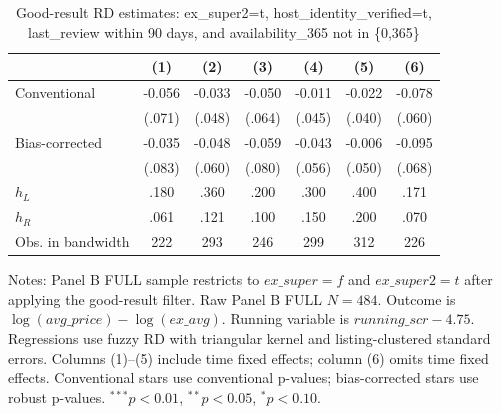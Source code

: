 \begin{table}[!htbp]
\centering
\caption{Good-result RD estimates: ex\_super2=t, host\_identity\_verified=t, last\_review within 90 days, and availability\_365 not in \{0,365\}}
\label{tab:good_result_verified_last_review90_no_av365_extreme_full}
\begin{tabular}{lcccccc}
\hline
 & (1) & (2) & (3) & (4) & (5) & (6) \\
\hline
Conventional & -0.056 & -0.033 & -0.050 & -0.011 & -0.022 & -0.078
\\
 & (.071) & (.048) & (.064) & (.045) & (.040) & (.060)
\\
Bias-corrected & -0.035 & -0.048 & -0.059 & -0.043 & -0.006 & -0.095
\\
 & (.083) & (.060) & (.080) & (.056) & (.050) & (.068)
\\
$h_L$ & .180 & .360 & .200 & .300 & .400 & .171
\\
$h_R$ & .061 & .121 & .100 & .150 & .200 & .070
\\
Obs. in bandwidth & 222 & 293 & 246 & 299 & 312 & 226
\\
\hline
\end{tabular}
\begin{flushleft}
\footnotesize Notes: Panel B FULL sample restricts to $ex\_super=f$ and $ex\_super2=t$ after applying the good-result filter. Raw Panel B FULL $N=484$. Outcome is $\log(avg\_price)-\log(ex\_avg)$. Running variable is $running\_scr-4.75$. Regressions use fuzzy RD with triangular kernel and listing-clustered standard errors. Columns (1)--(5) include time fixed effects; column (6) omits time fixed effects. Conventional stars use conventional p-values; bias-corrected stars use robust p-values. $^{***}p<0.01$, $^{**}p<0.05$, $^{*}p<0.10$.
\end{flushleft}
\end{table}

